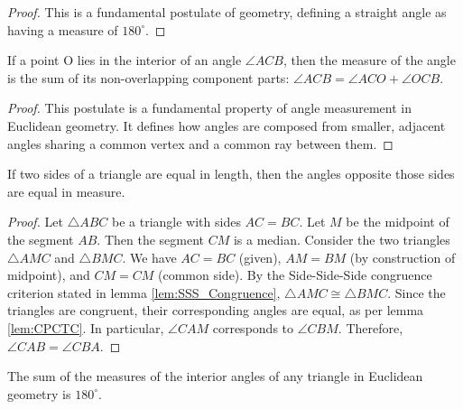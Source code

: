 \begin{proof}
    This is a fundamental postulate of geometry, defining a straight angle as having a measure of $180^\circ$.
\end{proof}

\begin{lemma}
    \label{lem:Angle_Addition_Postulate}
    If a point O lies in the interior of an angle $\angle ACB$, then the measure of the angle is the sum of its non-overlapping component parts: $\angle ACB = \angle ACO + \angle OCB$.
\end{lemma}

\begin{proof}
    This postulate is a fundamental property of angle measurement in Euclidean geometry. It defines how angles are composed from smaller, adjacent angles sharing a common vertex and a common ray between them.
\end{proof}

\begin{lemma}
    \label{lem:Isosceles_Triangle_Theorem}
    If two sides of a triangle are equal in length, then the angles opposite those sides are equal in measure.
\end{lemma}

\begin{proof}
    Let $\triangle ABC$ be a triangle with sides $AC = BC$. Let $M$ be the midpoint of the segment $AB$. Then the segment $CM$ is a median. Consider the two triangles $\triangle AMC$ and $\triangle BMC$. We have $AC = BC$ (given), $AM = BM$ (by construction of midpoint), and $CM = CM$ (common side). By the Side-Side-Side congruence criterion stated in lemma \ref{lem:SSS_Congruence}, $\triangle AMC \cong \triangle BMC$. Since the triangles are congruent, their corresponding angles are equal, as per lemma \ref{lem:CPCTC}. In particular, $\angle CAM$ corresponds to $\angle CBM$. Therefore, $\angle CAB = \angle CBA$.
\end{proof}

\begin{lemma}
    \label{lem:Sum_of_Angles_in_a_Triangle}
    The sum of the measures of the interior angles of any triangle in Euclidean geometry is $180^\circ$.
\end{lemma}

